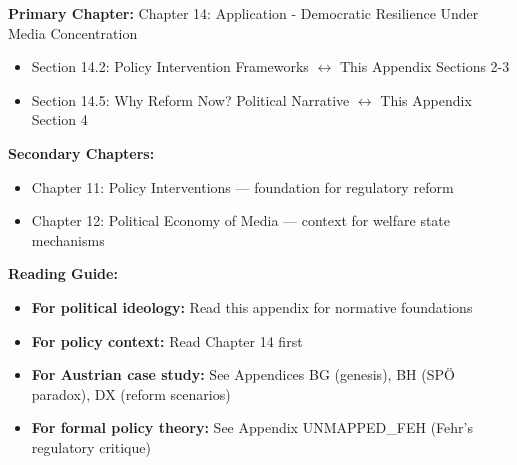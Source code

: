 \begin{tcolorbox}[colback=purple!5!white, colframe=purple!75!black,
    title=Chapter Linkage]

\textbf{Primary Chapter:} Chapter 14: Application - Democratic Resilience Under Media Concentration

\begin{itemize}[nosep]
\item Section 14.2: Policy Intervention Frameworks $\leftrightarrow$ This Appendix Sections 2-3
\item Section 14.5: Why Reform Now? Political Narrative $\leftrightarrow$ This Appendix Section 4
\end{itemize}

\textbf{Secondary Chapters:}
\begin{itemize}[nosep]
\item Chapter 11: Policy Interventions --- foundation for regulatory reform
\item Chapter 12: Political Economy of Media --- context for welfare state mechanisms
\end{itemize}

\textbf{Reading Guide:}
\begin{itemize}[nosep]
\item \textbf{For political ideology:} Read this appendix for normative foundations
\item \textbf{For policy context:} Read Chapter 14 first
\item \textbf{For Austrian case study:} See Appendices BG (genesis), BH (SPÖ paradox), DX (reform scenarios)
\item \textbf{For formal policy theory:} See Appendix UNMAPPED_FEH (Fehr's regulatory critique)
\end{itemize}

\end{tcolorbox}



